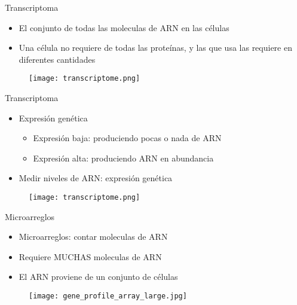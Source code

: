 \documentclass{beamer}
\begin{document}
\begin{frame}{Transcriptoma}
\begin{itemize}
\item El conjunto de todas las moleculas de ARN en las células
\item Una célula no requiere de todas las proteínas, y las que usa las requiere en diferentes cantidades
\end{itemize}
\begin{figure}[H]
\centering
\texttt{[image: transcriptome.png]}
\end{figure}
\end{frame}

\begin{frame}{Transcriptoma}
\begin{itemize}
\item Expresión genética 
\begin{itemize}
	\item Expresión baja: produciendo pocas o nada de ARN
	\item Expresión alta: produciendo ARN en abundancia
\end{itemize}
\item Medir niveles de ARN: expresión genética
\end{itemize}
\begin{figure}[H]
\centering
\texttt{[image: transcriptome.png]}
\end{figure}
\end{frame}


\begin{frame}{Microarreglos}
\begin{itemize}
\item Microarreglos: contar moleculas de ARN
\item Requiere MUCHAS moleculas de ARN
\item El ARN proviene de un conjunto de células
\end{itemize}
\begin{figure}[H]	
\centering
\texttt{[image: gene\_profile\_array\_large.jpg]}
\end{figure}
\end{frame}
\end{document}
